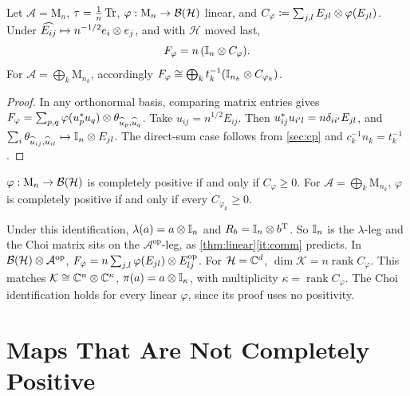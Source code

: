 \documentclass[12pt]{article}
\newcommand{\alg}{\mathcal{A}}             %
\newcommand{\hilb}{\mathcal{H}}            %
\newcommand{\dil}{\mathcal{K}}             %
\newcommand{\bdd}[1]{\mathcal{B}\br{#1}}   %
\newcommand{\Mn}[1]{\mathrm{M}_{#1}}       %
\newcommand{\op}{^{\mathrm{op}}}           %
\newcommand{\rankone}[2]{\theta_{#1, #2}}  %
\newcommand{\vect}[1]{\widehat{#1}}
\newcommand{\Fphi}{F_{\varphi}}
\newcommand{\Choi}{C_{\varphi}}
\begin{document}
\begin{theorem}
\label{thm:choi}
Let \(\alg = \Mn n\), \(\tau = \frac1n\operatorname{Tr}\), \(\varphi : \Mn n \to \bdd\hilb\)
linear, and \(\Choi \eqdef \sum_{j,l} E_{jl} \tensor \varphi(E_{jl})\). Under
\(\vect{E_{ij}} \mapsto n^{-1/2}e_i \tensor e_j\), and with \(\hilb\) moved last,
\[
  \Fphi = n\,(\id_n \tensor \Choi).
\]
For \(\alg = \bigoplus_k \Mn{n_k}\), accordingly
\(\Fphi \cong \bigoplus_k t_k^{-1}(\id_{n_k} \tensor C_{\varphi_k})\).
\end{theorem}
\begin{proof}
In any orthonormal basis, comparing matrix entries gives
\(\Fphi = \sum_{p,q}\varphi(u_p^\adjoint u_q) \tensor \rankone{\vect u_p}{\vect u_q}\).
Take \(u_{ij} = n^{1/2}E_{ij}\). Then
\(u_{ij}^* u_{i'l} = n\delta_{ii'}E_{jl}\), and
\(\sum_i \rankone{\vect u_{ij}}{\vect u_{il}} \mapsto \id_n \tensor E_{jl}\).
The direct-sum case follows from \cref{sec:cp} and \(c_k^{-1}n_k = t_k^{-1}\).
\end{proof}

\begin{corollary}
\label{cor:choi}
\(\varphi : \Mn n \to \bdd\hilb\) is completely positive if and only if
\(\Choi \ge 0\). For \(\alg = \bigoplus_k \Mn{n_k}\), \(\varphi\) is completely
positive if and only if every \(C_{\varphi_k} \ge 0\).
\end{corollary}

\begin{remark}
\label{rem:legs}
Under this identification, \(\lambda(a) = a \otimes {\mathbb I}_n\) and
\(R_b = {\mathbb I}_n \otimes b^{\mathrm T}\). So \({\mathbb I}_n\) is the \(\lambda\)-leg and the
Choi matrix sits on the \(\alg\op\)-leg, as \cref{thm:linear}\ref{it:comm}
predicts. In \(\bdd\hilb \tensor \alg\op\),
\(\Fphi = n\sum_{j,l}\varphi(E_{jl}) \tensor E_{lj}\op\).
For \(\hilb = \complex^d\), \(\dim\dil = n\operatorname{rank}\Choi\). This matches
\(\dil \cong \complex^n \tensor \complex^\kappa\), \(\pi(a) = a \otimes {\mathbb I}_\kappa\),
with multiplicity \(\kappa = \operatorname{rank}\Choi\). The Choi identification
holds for every linear \(\varphi\), since its proof uses no positivity.
\end{remark}

\section{Maps That Are Not Completely Positive}
\label{sec:non-cp}
\end{document}
